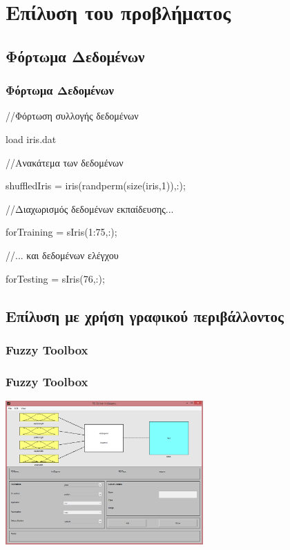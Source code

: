 \documentclass[xetex,serif,mathserif,14pt]{beamer}
\begin{document}

\section{Επίλυση του προβλήματος}

\subsection{Φόρτωμα Δεδομένων}

\begin{frame}
\frametitle{Φόρτωμα Δεδομένων}
    //Φόρτωση συλλογής δεδομένων

    load iris.dat

    //Ανακάτεμα  των δεδομένων

    shuffledIris = iris(randperm(size(iris,1)),:);

    //Διαχωρισμός δεδομένων εκπαίδευσης...

    forTraining = sIris(1:75,:);

    //... και δεδομένων ελέγχου

    forTesting = sIris(76,:);
\end{frame}

\subsection{Επίλυση με χρήση γραφικού περιβάλλοντος}

\subsubsection{Fuzzy Toolbox}
\begin{frame}
\frametitle{Fuzzy Toolbox}
\centering
\includegraphics[height=5.5cm]{images/fuzzySugeno.png}
\end{frame}
\end{document}
